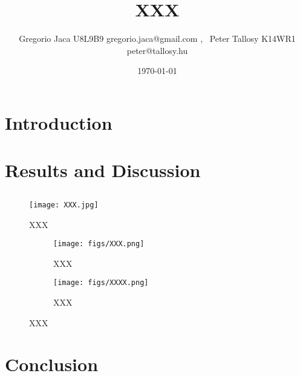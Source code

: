 \documentclass[12pt,a4paper]{article}
\title{XXX}
\author{Gregorio Jaca U8L9B9 gregorio.jaca@gmail.com , \ Peter Tallosy K14WR1 peter@tallosy.hu }
\date{\today}
\begin{document}
\maketitle

\begin{abstract}

\end{abstract}

\section{Introduction}

\section{Results and Discussion}

\subsection{}

\begin{figure} [H]
    \centering
    \texttt{[image: XXX.jpg]}
    \caption{XXX}
    \label{fig:XXX}
\end{figure}

\begin{figure}[H]
    \centering
    \begin{subfigure}[b]{0.48\linewidth}
        \centering
        \texttt{[image: figs/XXX.png]}
        \caption{XXX}
    \end{subfigure}\hfill
    \begin{subfigure}[b]{0.48\linewidth}
        \centering
        \texttt{[image: figs/XXXX.png]}
        \caption{XXX}
    \end{subfigure}

    \caption{XXX}
    \label{fig:XXX}
\end{figure}

\section{Conclusion}
\end{document}
